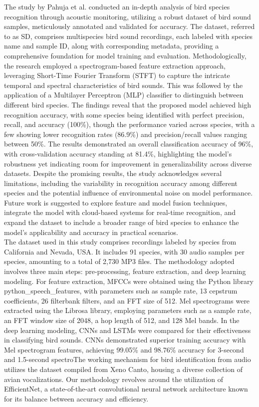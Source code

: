 The study\cite{pahuja2021sound} by Pahuja et al. conducted an in-depth analysis
of bird species recognition through acoustic monitoring, utilizing a robust
dataset of bird sound samples, meticulously annotated and validated for
accuracy. The dataset, referred to as SD, comprises multispecies bird sound
recordings, each labeled with species name and sample ID, along with
corresponding metadata, providing a comprehensive foundation for model training
and evaluation. Methodologically, the research employed a spectrogram-based
feature extraction approach, leveraging Short-Time Fourier Transform (STFT) to
capture the intricate temporal and spectral characteristics of bird sounds.
This was followed by the application of a Multilayer Perceptron (MLP)
classifier to distinguish between different bird species. The findings reveal
that the proposed model achieved high recognition accuracy, with some species
being identified with perfect precision, recall, and accuracy (100\%), though
the performance varied across species, with a few showing lower recognition
rates (86.9\%) and precision/recall values ranging between 50\%. The
results demonstrated an overall classification accuracy of 96\%, with
cross-validation accuracy standing at 81.4\%, highlighting the model's
robustness yet indicating room for improvement in generalizability across
diverse datasets. Despite the promising results, the study acknowledges several
limitations, including the variability in recognition accuracy among different
species and the potential influence of environmental noise on model
performance. Future work is suggested to explore feature and model fusion
techniques, integrate the model with cloud-based systems for real-time
recognition, and expand the dataset to include a broader range of bird species
to enhance the model's applicability and accuracy in practical scenarios.\\

The dataset used in this study\cite{carvalho2023automatic} comprises recordings
labeled by species from California and Nevada, USA. It includes 91 species,
with 30 audio samples per species, amounting to a total of 2,730 MP3 files. The
methodology adopted involves three main steps: pre-processing, feature
extraction, and deep learning modeling. For feature extraction, MFCCs were
obtained using the Python library python\_speech\_features, with parameters
such as sample rate, 13 cepstrum coefficients, 26 filterbank filters, and an
FFT size of 512. Mel spectrograms were extracted using the Librosa library,
employing parameters such as a sample rate, an FFT window size of 2048, a hop
length of 512, and 128 Mel bands. In the deep learning modeling, CNNs and LSTMs
were compared for their effectiveness in classifying bird sounds. CNNs
demonstrated superior training accuracy with Mel spectrogram features,
achieving 99.05\% and 98.76\% accuracy for 3-second and 1.5-second spectroThe
working mechanism for bird identification from audio utilizes the dataset
compiled from Xeno Canto, housing a diverse collection of avian vocalizations.
Our methodology revolves around the utilization of EfficientNet, a
state-of-the-art convolutional neural network architecture known for its
balance between accuracy and efficiency.

